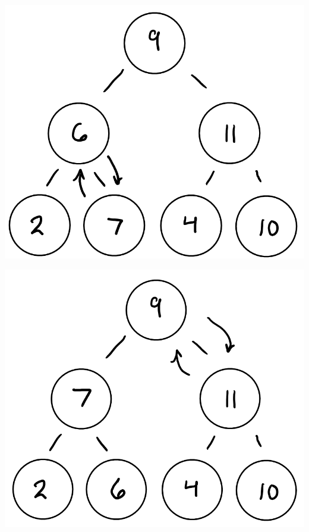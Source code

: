 \documentclass[12pt,twoside]{article}
\begin{document}
\begin{problems}
\begin{problemparts}
\begin{center}
        \includegraphics[scale=0.4]{Images/P1A4ii.PNG}
    \end{center}
    \begin{center}
        \includegraphics[scale=0.4]{Images/P1A4iii.PNG}

\end{center}
\end{problemparts}
\end{problems}
\end{document}
